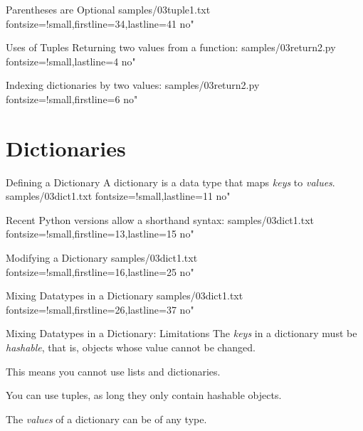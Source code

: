 \documentclass{pyslides}
\begin{document}
\begin{frame}[fragile]{Parentheses are Optional}
 samples/03tuple1.txt fontsize=!small,firstline=34,lastline=41 no"
\end{frame}

\begin{frame}[fragile]{Uses of Tuples}
Returning two values from a function:
 samples/03return2.py fontsize=!small,lastline=4 no"

\bigskip

Indexing dictionaries by two values:
 samples/03return2.py fontsize=!small,firstline=6 no"
\end{frame}

\section{Dictionaries}

\begin{frame}[fragile]{Defining a Dictionary}
A dictionary is a data type that maps \emph{keys} to \emph{values}.
 samples/03dict1.txt fontsize=!small,lastline=11 no"

\bigskip

Recent Python versions allow a shorthand syntax:
 samples/03dict1.txt fontsize=!small,firstline=13,lastline=15 no"
\end{frame}

\begin{frame}[fragile]{Modifying a Dictionary}
 samples/03dict1.txt fontsize=!small,firstline=16,lastline=25 no"

\end{frame}

\begin{frame}[fragile]{Mixing Datatypes in a Dictionary}
 samples/03dict1.txt fontsize=!small,firstline=26,lastline=37 no"
\end{frame}

\begin{frame}[fragile]{Mixing Datatypes in a Dictionary: Limitations}
The \emph{keys} in a dictionary must be \emph{hashable}, that is, objects whose value cannot be changed.

\bigskip

This means you cannot use lists and dictionaries.

You can use tuples, as long they only contain hashable objects.

\bigskip

The \emph{values} of a dictionary can be of any type.

\end{frame}
\end{document}
